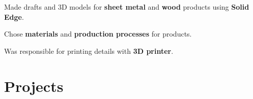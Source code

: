 \documentclass[letterpaper]{deedy-resume} %
\begin{document}
\begin{minipage}[t]{0.66\textwidth}
\sectionspace %



\begin{tightitemize}
  \item Made drafts and 3D models for \textbf{sheet metal} and \textbf{wood} products using \textbf{Solid Edge}.
  \item Chose \textbf{materials} and \textbf{production processes} for products.
  \item Was responsible for printing details with \textbf{3D printer}.
\end{tightitemize}

\sectionspace %



\section{Projects}

%
%




\end{minipage}
\end{document}
